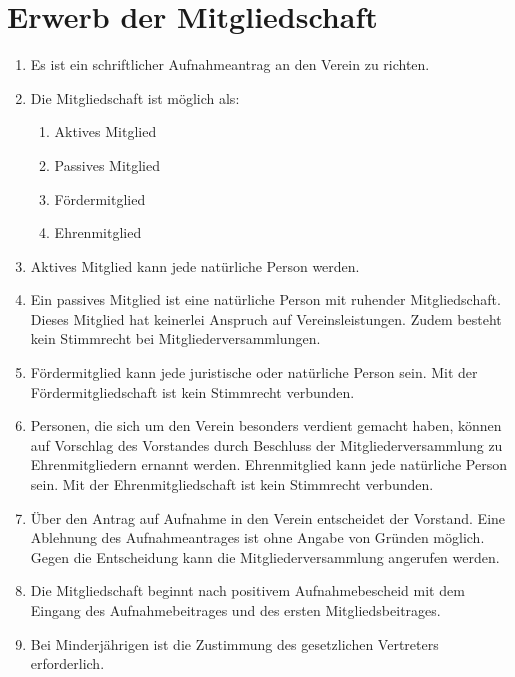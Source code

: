 \documentclass[a4paper,ngerman]{scrartcl}
\begin{document}
\section{Erwerb der Mitgliedschaft}
\begin{enumerate}
\item Es ist ein schriftlicher Aufnahmeantrag an den Verein zu richten.
\item Die Mitgliedschaft ist möglich als:
\begin{enumerate}
\item Aktives Mitglied
\item Passives Mitglied
\item Fördermitglied
\item Ehrenmitglied
\end{enumerate}
\item Aktives Mitglied kann jede natürliche Person werden.
\item Ein passives Mitglied ist eine natürliche Person mit ruhender Mitgliedschaft. Dieses Mitglied hat keinerlei Anspruch auf Vereinsleistungen. Zudem besteht kein Stimmrecht bei Mitgliederversammlungen.\label{passive Mitgliedschaft}
\item Fördermitglied kann jede juristische oder natürliche Person sein. Mit der Fördermitgliedschaft ist kein Stimmrecht verbunden.
\item
Personen, die sich um den Verein besonders verdient gemacht haben, können auf Vorschlag des Vorstandes durch Beschluss der Mitgliederversammlung zu Ehrenmitgliedern ernannt werden.
Ehrenmitglied kann jede natürliche Person sein. Mit der Ehrenmitgliedschaft ist kein Stimmrecht verbunden.
\item Über den Antrag auf Aufnahme in den Verein entscheidet der Vorstand. Eine Ablehnung des Aufnahmeantrages ist ohne Angabe von Gründen möglich. Gegen die Entscheidung kann die Mitgliederversammlung angerufen werden.
\item Die Mitgliedschaft beginnt nach positivem Aufnahmebescheid mit dem Eingang des Aufnahmebeitrages und des ersten Mitgliedsbeitrages.
\item Bei Minderjährigen ist die Zustimmung des gesetzlichen Vertreters erforderlich.
\end{enumerate}
\end{document}
